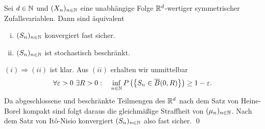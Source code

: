 \begin{corollary}
    Sei $d \in \mathbb{N}$ und $(X_n)_{n \in \mathbb{N}}$ eine unabhängige Folge $\mathbb{R}^d$-wertiger symmetrischer Zufallsvariablen. Dann sind äquivalent 
    \begin{enumerate}[(i)]
        \item $(S_n)_{n \in \mathbb{N}}$ konvergiert fast sicher.
        \item $(S_n)_{n \in \mathbb{N}}$ ist stochastisch beschränkt. 
    \end{enumerate} 
\end{corollary}
\begin{proof*}
    $(i) \Rightarrow (ii)$ ist klar. Aus $(ii)$ erhalten wir unmittelbar
    $$
        \forall \varepsilon > 0 \ \exists R > 0: \quad \inf_{n \in \mathbb{N}}P\left(\left\{ S_n \in \overline{B}(0,R) \right\}\right) \geq 1 - \varepsilon.
    $$
    Da abgeschlossene und beschränkte Teilmengen des $\mathbb{R}^d$ nach dem Satz von Heine-Borel kompakt sind folgt daraus die gleichmäßige Straffheit von $(\mu_n)_{n \in \mathbb{N}}$. 
    Nach dem Satz von Itô-Nisio konvergiert $(S_n)_{n \in \mathbb{N}}$ also fast sicher. \qed 
\end{proof*}